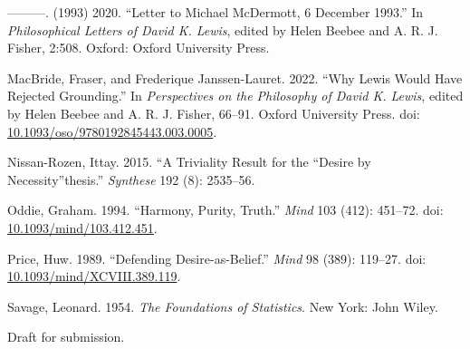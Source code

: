 \documentclass[
  11pt,
  letterpaper,
  DIV=11,
  numbers=noendperiod,
  twoside]{scrartcl}
\newlength{\cslhangindent}
\newenvironment{CSLReferences}[2] %
 {\begin{list}{}{%
  \setlength{\itemindent}{0pt}
  \setlength{\leftmargin}{0pt}
  \setlength{\parsep}{0pt}
  \ifodd #1
   \setlength{\leftmargin}{\cslhangindent}
   \setlength{\itemindent}{-1\cslhangindent}
  \fi
  \setlength{\itemsep}{#2\baselineskip}}}
 {\end{list}}
\begin{document}
\begin{CSLReferences}{1}{0}
---------. (1993) 2020. {``Letter to Michael McDermott, 6 December
1993.''} In \emph{Philosophical Letters of David {K}. Lewis}, edited by
Helen Beebee and A. R. J. Fisher, 2:508. Oxford: Oxford University
Press.

MacBride, Fraser, and Frederique Janssen-Lauret. 2022. {``Why Lewis
Would Have Rejected Grounding.''} In \emph{Perspectives on the
Philosophy of {D}avid {K}. {L}ewis}, edited by Helen Beebee and A. R. J.
Fisher, 66--91. {O}xford {U}niversity {P}ress. doi:
\href{https://doi.org/10.1093/oso/9780192845443.003.0005}{10.1093/oso/9780192845443.003.0005}.

Nissan-Rozen, Ittay. 2015. {``A Triviality Result for the ``Desire by
Necessity''thesis.''} \emph{Synthese} 192 (8): 2535--56.

Oddie, Graham. 1994. {``Harmony, Purity, Truth.''} \emph{Mind} 103
(412): 451--72. doi:
\href{https://doi.org/10.1093/mind/103.412.451}{10.1093/mind/103.412.451}.

Price, Huw. 1989. {``Defending Desire-as-Belief.''} \emph{Mind} 98
(389): 119--27. doi:
\href{https://doi.org/10.1093/mind/XCVIII.389.119}{10.1093/mind/XCVIII.389.119}.

Savage, Leonard. 1954. \emph{The Foundations of Statistics}. New York:
John Wiley.

\end{CSLReferences}



\noindent Draft for submission.
\end{document}
